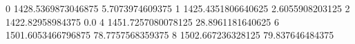 0 1428.5369873046875 5.7073974609375
1 1425.4351806640625 2.6055908203125
2 1422.82958984375 0.0
4 1451.7257080078125 28.8961181640625
6 1501.6053466796875 78.7757568359375
8 1502.667236328125 79.837646484375
